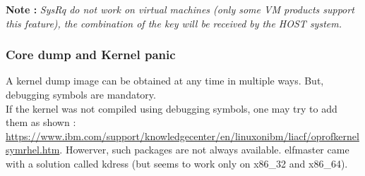 \textbf{\color{orange}Note :} \emph{\color{red}SysRq do not work on virtual machines (only some VM products support this feature), the combination of the key will be received by the HOST system.}

\subsubsection{Core dump and Kernel panic}
A kernel dump image can be obtained at any time in multiple ways. But, debugging symbols are mandatory.\\
If the kernel was not compiled using debugging symbols, one may try to add them as shown : {\color{blue}\url{https://www.ibm.com/support/knowledgecenter/en/linuxonibm/liacf/oprofkernelsymrhel.htm}}. Howerver, such packages are not always available. elfmaster came with a solution called kdress (but seems to work only on x86\_32 and x86\_64).


